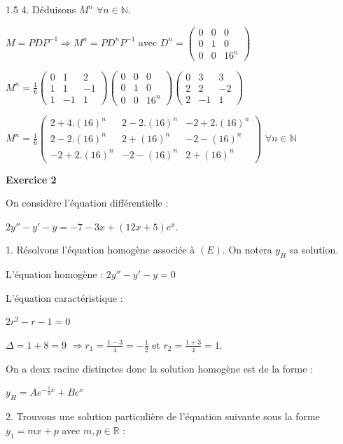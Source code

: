 \documentclass[12pt]{article}
\begin{document}
\begin{spacing}{1.5}
4. Déduisons $M^{n}$ $\forall n\in \mathbb{N}$.

$M=PDP^{-1}\Rightarrow M^n=PD^nP^{-1}$ avec $D^n=\begin{pmatrix}
0 & 0 & 0 \\ 
0 & 1 & 0 \\ 
0 & 0 & 16^n
\end{pmatrix}$

$M^n=\frac{1}{6}\begin{pmatrix}
0 & 1  & 2 \\ 
1 & 1  & -1\\ 
1 & -1 & 1 
\end{pmatrix}\begin{pmatrix}
0 & 0 & 0 \\ 
0 & 1 & 0 \\ 
0 & 0 & 16^n
\end{pmatrix}\begin{pmatrix}
0 & 3  & 3 \\ 
2 & 2  & -2\\ 
2 & -1 & 1 
\end{pmatrix}$

$M^n=\frac{1}{6}\begin{pmatrix}
2+4.(16)^n & 2-2.(16)^n  & -2+2.(16)^n \\ 
2-2.(16)^n & 2+(16)^n  & -2-(16)^n\\ 
-2+2.(16)^n & -2-(16)^n & 2+(16)^n 
\end{pmatrix}$ $\forall n\in \mathbb{N}$

\medskip
\textbf{Exercice 2}

On considère l'équation différentielle :

\begin{center}
$2y''-y'-y=-7-3x+(12x+5)e^x$.
\end{center}

1. Résolvons l'équation homogène associée à $(E)$. On notera $y_H$ sa solution.

L'équation homogène :
$2y''-y'-y=0$

L'équation caractéristique :

$2r^2-r-1=0$

$\Delta=1+8=9$ $\Longrightarrow r_1=\frac{1-3}{4}=-\frac{1}{2}$ et $r_2=\frac{1+3}{4}=1$.

On a deux racine distinctes donc la solution homogène est de la forme :

$y_H=Ae^{-\frac{1}{2}x}+Be^x$


2. Trouvons une solution particulière de l'équation suivante sous la forme $y_1=mx+p$ avec $m,p\in \mathbb{R}$ :


\end{spacing}
\end{document}
